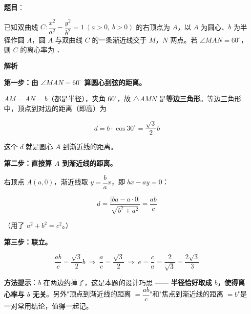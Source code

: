 \begin{answer}

\textbf{题目}：

已知双曲线 $C:\dfrac{x^{2}}{a^{2}}-\dfrac{y^{2}}{b^{2}}=1\ (a>0,\ b>0)$ 的右顶点为 $A$，以 $A$ 为圆心、$b$ 为半径作圆 $A$，圆 $A$ 与双曲线 $C$ 的一条渐近线交于 $M$，$N$ 两点。若 $\angle MAN=60^\circ$，则 $C$ 的离心率为 \gkblank{}．

\textbf{解析}

\textbf{第一步：由 $\angle MAN=60^\circ$ 算圆心到弦的距离。}

$AM=AN=b$（都是半径），夹角 $60^\circ$，故 $\triangle AMN$ 是\textbf{等边三角形}。等边三角形中，顶点到对边的距离（即高）为

\nopagebreak[4]
\[d=b\cdot\cos30^\circ=\frac{\sqrt3}2b\]

这个 $d$ 就是圆心 $A$ 到渐近线的距离。

\textbf{第二步：直接算 $A$ 到渐近线的距离。}

右顶点 $A(a,0)$，渐近线取 $y=\dfrac bax$，即 $bx-ay=0$：

\nopagebreak[4]
\[d=\frac{|ba-a\cdot0|}{\sqrt{b^{2}+a^{2}}}=\frac{ab}{c}\]

（用了 $a^{2}+b^{2}=c^{2}$。）

\textbf{第三步：联立。}

\nopagebreak[4]
\[\frac{ab}c=\frac{\sqrt3}2b\ \Longrightarrow\ \frac ac=\frac{\sqrt3}2\ \Longrightarrow\ e=\frac ca=\frac2{\sqrt3}=\frac{2\sqrt3}3\]

\begin{gktip}
\textbf{方法提示}：$b$ 在两边约掉了，这是本题的设计巧思 —— \textbf{半径恰好取成 $b$，使得离心率与 $b$ 无关}。另外"顶点到渐近线的距离 $=\dfrac{ab}c$"和"焦点到渐近线的距离 $=b$"是一对常用结论，值得一起记。
\end{gktip}


\par\medskip

\end{answer}
